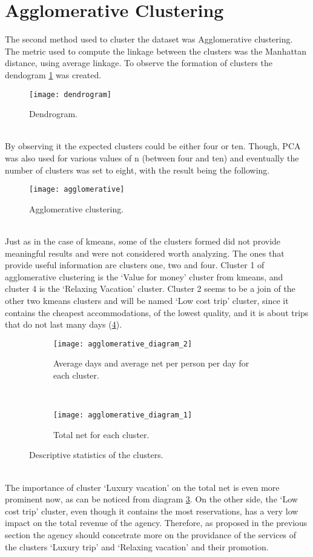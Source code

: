 \section{Agglomerative Clustering}
The second method used to cluster the dataset was Agglomerative clustering. The metric used to compute the linkage between the clusters was the Manhattan distance, using average linkage. To observe the formation of clusters the dendogram \ref{fig:dendrogram} was created. 
\begin{figure}[!h]
\centering
\texttt{[image: dendrogram]}
\caption{Dendrogram.}
\label{fig:dendrogram}
\end{figure}
\\
By observing it the expected clusters could be either four or ten. Though, PCA was also used for various values of n (between four and ten) and eventually the number of clusters was set to eight, with the result being the following. 
\begin{figure}[!h]
\centering
\texttt{[image: agglomerative]}
\caption{Agglomerative clustering.}
\label{fig:agglomerative}
\end{figure}
\\
Just as in the case of kmeans, some of the clusters formed did not provide meaningful results and were not considered worth analyzing. The ones that provide useful information are clusters one, two and four. Cluster 1 of agglomerative clustering is the `Value for money' cluster from kmeans, and cluster 4 is the `Relaxing Vacation' cluster. Cluster 2 seems to be a join of the other two kmeans clusters and will be named `Low cost trip' cluster, since it contains the cheapest accommodations, of the lowest quality, and it is about trips that do not last many days (\ref{fig:agglomerative2}).
\begin{figure}
\centering
\begin{subfigure}{0.8\textwidth}
\centering
\texttt{[image: agglomerative\_diagram\_2]}
\caption{Average days and average net per person per day for each cluster.}
\label{fig:agglomerative1}
\end{subfigure}%
\\
\begin{subfigure}{0.8\textwidth}
\centering
\texttt{[image: agglomerative\_diagram\_1]}
\caption{Total net for each cluster.}
\label{fig:agglomerative2}
\end{subfigure}%
\caption{Descriptive statistics of the clusters.}
\label{fig:agglomerative_descriptives}
\end{figure}
\\
The importance of cluster `Luxury vacation' on the total net is even more prominent now, as can be noticed from diagram \ref{fig:agglomerative1}. On the other side, the `Low cost trip' cluster, even though it contains the most reservations, has a very low impact on the total revenue of the agency. Therefore, as proposed in the previous section the agency should concetrate more on the providance of the services of the clusters `Luxury trip' and `Relaxing vacation' and their promotion.